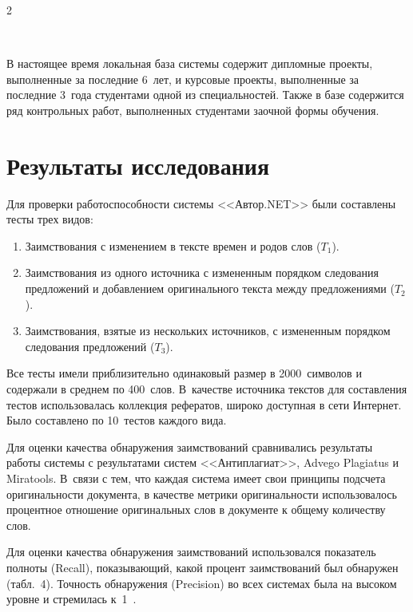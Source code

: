 \begin{multicols}{2}
{}



\begin{figure} %
\vspace*{1pt}
 \begin{center}
 \mbox{%
 \epsfxsize=160mm
 }
 \end{center}
 \vspace*{-9pt}
\end{figure}

  
  В настоящее время локальная база сис\-те\-мы содержит дипломные проекты, 
выполненные за последние 6~лет, и курсовые проекты, выполненные за 
последние 3~года студентами одной из специальностей. Также в базе 
содержится ряд контрольных работ, выполненных студентами заочной формы 
обучения. 


\section{Результаты исследования}

  Для проверки работоспособности сис\-те\-мы <<Автор.NET>> были 
составлены тесты трех видов:
  \begin{enumerate}[1.]
\item Заимствования с изменением в тексте времен и родов слов ($T_1$).
\item Заимствования из одного источника с измененным порядком следования 
предложений и добавлением оригинального текста между предложениями 
($T_2$).
\item Заимствования, взятые из нескольких источников, с измененным 
порядком следования предложений ($T_3$).
\end{enumerate}

  Все тесты имели приблизительно одинаковый размер в 2000~символов и 
содержали в среднем по 400~слов. В~качестве источника текстов для 
составления тестов использовалась коллекция рефератов, широко доступная в 
сети Интернет. Было составлено по 10~тестов каждого вида. 
  
  Для оценки качества обнаружения заимствований сравнивались результаты 
работы сис\-те\-мы с результатами сис\-тем <<Антиплагиат>>, {Advego 
Plagiatus} и {Miratools}. В~связи с тем, что каждая сис\-те\-ма имеет свои 
принципы подсчета оригинальности документа, в качестве метрики 
оригинальности использовалось процентное отношение оригинальных слов в 
документе к общему количеству слов.
  
  Для оценки качества обнаружения заимствований использовался показатель 
полноты (Recall), показывающий, какой процент заимствований был 
обнаружен (табл.~4). Точность обнаружения (Precision) во всех 
сис\-те\-мах была на высоком уровне и стремилась к~1~\cite{15-sha}.




\end{multicols}

